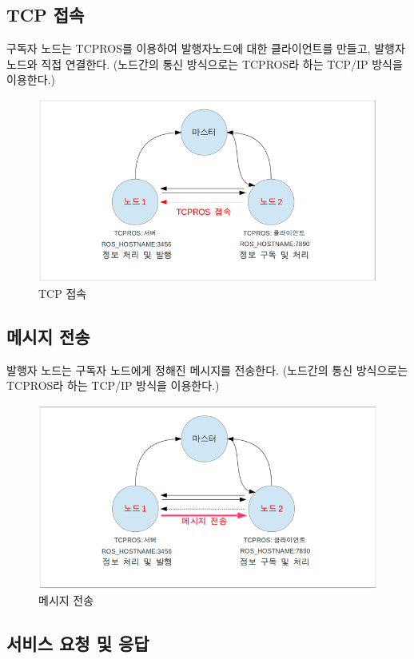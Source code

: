 \subsection{TCP 접속}

구독자 노드는 TCPROS를 이용하여 발행자노드에 대한 클라이언트를 만들고, 발행자노드와 직접 연결한다. (노드간의 통신 방식으로는 TCPROS라 하는 TCP/IP 방식을 이용한다.)

\begin{figure}[h]
\centering\includegraphics[width=0.6\columnwidth]{pictures/chapter4/notion7.png}
\caption{TCP 접속}
\end{figure}

\subsection{메시지 전송}

발행자 노드는 구독자 노드에게 정해진 메시지를 전송한다. (노드간의 통신 방식으로는 TCPROS라 하는 TCP/IP 방식을 이용한다.)

\begin{figure}[h]
\centering\includegraphics[width=0.6\columnwidth]{pictures/chapter4/notion8.png}
\caption{메시지 전송}
\end{figure}

\subsection{서비스 요청 및 응답}

